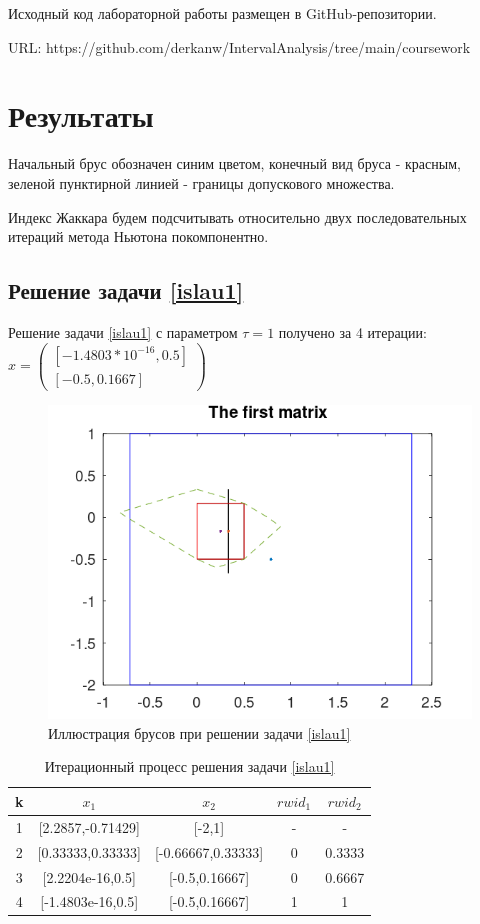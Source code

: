 \documentclass[12pt,a4paper]{article}
\begin{document}
Исходный код лабораторной работы размещен в GitHub-репозитории.

URL: https://github.com/derkanw/IntervalAnalysis/tree/main/coursework

\section {Результаты}
Начальный брус обозначен синим цветом, конечный вид бруса - красным, зеленой пунктирной линией - границы допускового множества.

Индекс Жаккара будем подсчитывать относительно двух последовательных итераций метода Ньютона покомпонентно.

\subsection{Решение задачи \eqref{islau1}}
Решение задачи \eqref{islau1} с параметром $\tau=1$ получено за 4 итерации: $x=
\begin{pmatrix}
    [-1.4803*10^{-16},0.5]\\
    [-0.5,0.1667]
\end{pmatrix}$

\begin{figure}[H]
    \centering
    \includegraphics[scale=0.6]{Images/matrix1.png}
    \caption{Иллюстрация брусов при решении задачи \eqref{islau1}}
\end{figure}

\begin{table}[H]
    \centering
    \begin{tabular}{|c|c|c|c|c|}
        \hline
        k & $x_1$ & $x_2$ & $rwid_1$ & $rwid_2$\\\hline
        1 & [2.2857,-0.71429] & [-2,1] & - & -\\\hline
        2 & [0.33333,0.33333] & [-0.66667,0.33333] & 0 & 0.3333\\\hline
        3 & [2.2204e-16,0.5] & [-0.5,0.16667] & 0 & 0.6667\\\hline
        4 & [-1.4803e-16,0.5] & [-0.5,0.16667] & 1 & 1\\\hline
    \end{tabular}
    \caption{Итерационный процесс решения задачи \eqref{islau1}}
\end{table}
\end{document}
